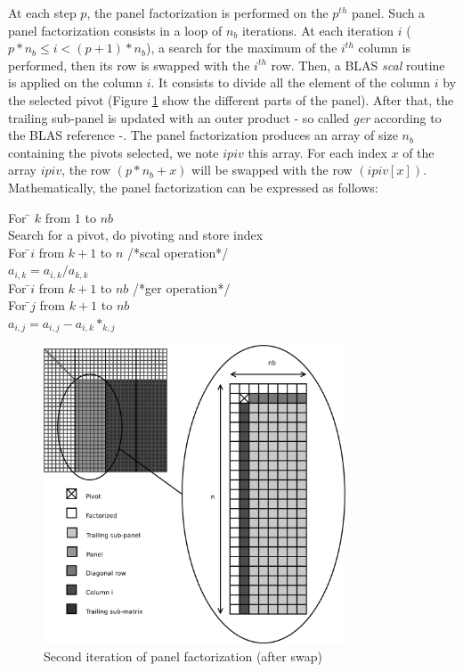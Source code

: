  
At each step $p$, the panel factorization is performed on the $p^{th}$ panel. Such a panel factorization consists in a loop of $n_b$ iterations. At each iteration $i$ ($p*n_b \leq i < (p+1)*n_b$), a search for the maximum of the $i^{th}$ column is performed, then its row is swapped with the $i^{th}$ row.
Then, a BLAS \textit{scal} routine is applied on the column $i$. It consists to divide all the element of the column $i$ by the selected pivot (Figure \ref{fig:panel} show the different parts of the panel).
After that, the trailing sub-panel is updated with an outer product - so called \textit{ger} according to the BLAS reference -. The panel factorization produces an array of size $n_b$ containing the pivots selected, we note $ipiv$ this array. For each index $x$ of the array $ipiv$, the row $(p*n_b + x)$ will be swapped with the row $(ipiv[x])$.
Mathematically, the panel factorization can be expressed as follows:\\
\begin{tabbing}
For \= $k$ from $1$ to $nb$\\
\> Search for a pivot, do pivoting and store index\\
\> For \=$i$ from $k+1$ to $n$    /*scal operation*/\\
\>\> $a_{i,k} = a_{i,k}/a_{k,k}$\\
\> For \=$i$ from $k+1$ to $nb$   /*ger operation*/\\
\>\> For \=$j$ from $k+1$ to $nb$\\
\>\>\> $a_{i,j} = a_{i,j}-a_{i,k}*_{k,j}$\\
\end{tabbing}

\begin{figure}[!ht]
\centering
\includegraphics[width=0.8\textwidth]{figures/panel.pdf}
\caption{Second iteration of panel factorization (after swap)\label{fig:panel}}
\end{figure}

